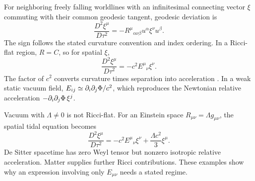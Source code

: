 \documentclass[11pt]{article}
\begin{document}
For neighboring freely falling worldlines with an infinitesimal connecting vector $\xi$ commuting with their common geodesic tangent, geodesic deviation is
\begin{equation}
\frac{D^2\xi^\mu}{D\tau^2}
=-R^\mu{}_{\alpha\nu\beta}u^\alpha\xi^\nu u^\beta.
\label{eq:geodesicdeviation}
\end{equation}
The sign follows the stated curvature convention and index ordering. In a Ricci-flat region, $R=C$, so for spatial $\xi$,
\begin{equation}
\boxed{\frac{D^2\xi^\mu}{D\tau^2}=-c^2E^\mu{}_{\nu}\xi^\nu.}
\end{equation}
The factor of $c^2$ converts curvature times separation into acceleration \parencite{Carroll1997}. In a weak static vacuum field, $E_{ij}\simeq\partial_i\partial_j\Phi/c^2$, which reproduces the Newtonian relative acceleration $-\partial_i\partial_j\Phi\,\xi^j$.

Vacuum with $\Lambda\ne0$ is not Ricci-flat. For an Einstein space $R_{\mu\nu}=\Lambda g_{\mu\nu}$, the spatial tidal equation becomes
\begin{equation}
\frac{D^2\xi^\mu}{D\tau^2}
=-c^2E^\mu{}_{\nu}\xi^\nu+\frac{\Lambda c^2}{3}\xi^\mu.
\end{equation}
De Sitter spacetime has zero Weyl tensor but nonzero isotropic relative acceleration. Matter supplies further Ricci contributions. These examples show why an expression involving only $E_{\mu\nu}$ needs a stated regime.
\end{document}
